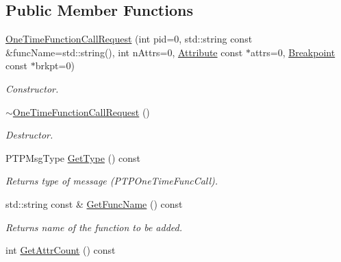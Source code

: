 \subsection*{Public Member Functions}
\begin{DoxyCompactItemize}
\item 
\hyperlink{class_common_1_1_one_time_function_call_request_a72c2db45188d05a5cd661d970c1734dd}{One\-Time\-Function\-Call\-Request} (int pid=0, std\-::string const \&func\-Name=std\-::string(), int n\-Attrs=0, \hyperlink{class_common_1_1_attribute}{Attribute} const $\ast$attrs=0, \hyperlink{class_common_1_1_breakpoint}{Breakpoint} const $\ast$brkpt=0)
\begin{DoxyCompactList}\small\item\em Constructor. \end{DoxyCompactList}\item 
\hypertarget{class_common_1_1_one_time_function_call_request_aee6880cf937a5a1af6027036b0a1c14d}{\hyperlink{class_common_1_1_one_time_function_call_request_aee6880cf937a5a1af6027036b0a1c14d}{$\sim$\-One\-Time\-Function\-Call\-Request} ()}\label{class_common_1_1_one_time_function_call_request_aee6880cf937a5a1af6027036b0a1c14d}

\begin{DoxyCompactList}\small\item\em Destructor. \end{DoxyCompactList}\item 
\hypertarget{class_common_1_1_one_time_function_call_request_a7c624b493dc20db48d8c6ccfc0f14693}{P\-T\-P\-Msg\-Type \hyperlink{class_common_1_1_one_time_function_call_request_a7c624b493dc20db48d8c6ccfc0f14693}{Get\-Type} () const }\label{class_common_1_1_one_time_function_call_request_a7c624b493dc20db48d8c6ccfc0f14693}

\begin{DoxyCompactList}\small\item\em Returns type of message (P\-T\-P\-One\-Time\-Func\-Call). \end{DoxyCompactList}\item 
\hypertarget{class_common_1_1_one_time_function_call_request_ad2a24593ef19e0d6efa1c7970b548427}{std\-::string const \& \hyperlink{class_common_1_1_one_time_function_call_request_ad2a24593ef19e0d6efa1c7970b548427}{Get\-Func\-Name} () const }\label{class_common_1_1_one_time_function_call_request_ad2a24593ef19e0d6efa1c7970b548427}

\begin{DoxyCompactList}\small\item\em Returns name of the function to be added. \end{DoxyCompactList}\item 
\hypertarget{class_common_1_1_one_time_function_call_request_af8640c5332f513916aa5861f0c81b6c5}{int \hyperlink{class_common_1_1_one_time_function_call_request_af8640c5332f513916aa5861f0c81b6c5}{Get\-Attr\-Count} () const }\label{class_common_1_1_one_time_function_call_request_af8640c5332f513916aa5861f0c81b6c5}


\end{DoxyCompactItemize}

